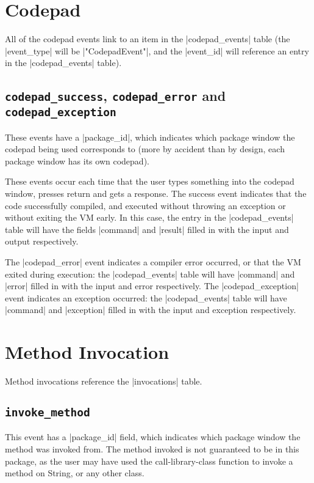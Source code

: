 \documentclass{book}
\begin{document}
\section{Codepad}

All of the codepad events link to an item in the |codepad_events| table (the
|event_type| will be |"CodepadEvent"|, and the |event_id| will reference an
entry in the |codepad_events| table).


\subsection{\lstinline|codepad_success|, \lstinline|codepad_error| and \lstinline|codepad_exception|}

These events have a |package_id|, which indicates which package window the
codepad being used corresponds to (more by accident than by design, each
package window has its own codepad).

These events occur each time that the user types something into the codepad
window, presses return and gets a response.  The success event indicates that the code
successfully compiled, and executed without throwing an exception or without
exiting the VM early.  In this case, the entry in the |codepad_events| table
will have the fields |command| and |result| filled in with the input and
output respectively.

The |codepad_error| event indicates a compiler error occurred, or that the VM
exited during execution: the
|codepad_events| table will have |command| and |error| filled in with the
input and error respectively.  The |codepad_exception| event indicates an exception occurred: the
|codepad_events| table will have |command| and |exception| filled in with the
input and exception respectively.


\section{Method Invocation}

Method invocations reference the |invocations| table.


\subsection{\lstinline|invoke_method|}

This event has a |package_id| field, which indicates which package window the
method was invoked from.  The method invoked is not guaranteed to be in this
package, as the user may have used the call-library-class function to invoke a
method on String, or any other class.
\end{document}
